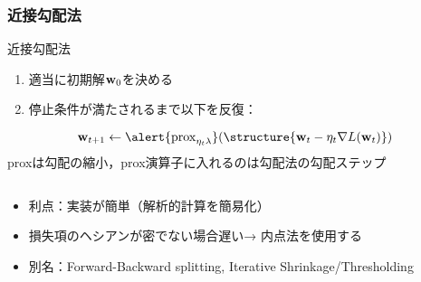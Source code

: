 \documentclass[9pt, dvipdfmx]{beamer}
\begin{document}
\begin{frame}
  \frametitle{近接勾配法}
  \begin{block}{近接勾配法}
    \begin{enumerate}
      \item 適当に初期解${\bf w}_0$を決める
      \item 停止条件が満たされるまで以下を反復：\\
    \end{enumerate}
    \begin{equation}
      {\bf w}_{t+1} \leftarrow \alert{{\rm prox}_{\eta_t\lambda}}(\structure{{\bf w}_t - \eta_t\nabla L({\bf w}_t)})
    \end{equation}
    proxは勾配の縮小，prox演算子に入れるのは勾配法の勾配ステップ
  \end{block}
  \begin{columns}
    \begin{column}[t]{.6\textwidth}
      \begin{itemize}
        \item 利点：実装が簡単（解析的計算を簡易化）
        \item 損失項のヘシアンが密でない場合遅い→ 内点法を使用する
        \item 別名：Forward-Backward splitting, Iterative Shrinkage/Thresholding
      \end{itemize}
    \end{column}
    \begin{column}[t]{.4\textwidth}
    \end{column}
  \end{columns}
\end{frame}
\end{document}
